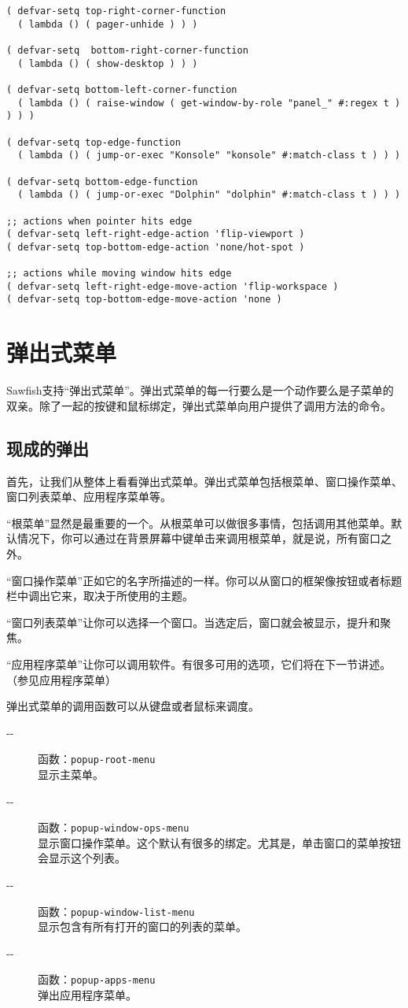 \documentclass{book}
\begin{document}
\begin{CJK*}{UTF8}{gbsn}
\begin{verbatim}
( defvar-setq top-right-corner-function
  ( lambda () ( pager-unhide ) ) )

( defvar-setq  bottom-right-corner-function
  ( lambda () ( show-desktop ) ) )

( defvar-setq bottom-left-corner-function
  ( lambda () ( raise-window ( get-window-by-role "panel_" #:regex t ) ) ) )

( defvar-setq top-edge-function
  ( lambda () ( jump-or-exec "Konsole" "konsole" #:match-class t ) ) )

( defvar-setq bottom-edge-function
  ( lambda () ( jump-or-exec "Dolphin" "dolphin" #:match-class t ) ) )

;; actions when pointer hits edge
( defvar-setq left-right-edge-action 'flip-viewport )
( defvar-setq top-bottom-edge-action 'none/hot-spot )

;; actions while moving window hits edge
( defvar-setq left-right-edge-move-action 'flip-workspace )
( defvar-setq top-bottom-edge-move-action 'none )
\end{verbatim}
\chapter{弹出式菜单}
Sawfish支持``弹出式菜单''。弹出式菜单的每一行要么是一个动作要么是子菜单的双亲。除了一起的按键和鼠标绑定，弹出式菜单向用户提供了调用方法的命令。
\section{现成的弹出}
首先，让我们从整体上看看弹出式菜单。弹出式菜单包括根菜单、窗口操作菜单、窗口列表菜单、应用程序菜单等。

``根菜单''显然是最重要的一个。从根菜单可以做很多事情，包括调用其他菜单。默认情况下，你可以通过在背景屏幕中键单击来调用根菜单，就是说，所有窗口之外。

``窗口操作菜单''正如它的名字所描述的一样。你可以从窗口的框架像按钮或者标题栏中调出它来，取决于所使用的主题。

``窗口列表菜单''让你可以选择一个窗口。当选定后，窗口就会被显示，提升和聚焦。

``应用程序菜单''让你可以调用软件。有很多可用的选项，它们将在下一节讲述。（参见应用程序菜单）

弹出式菜单的调用函数可以从键盘或者鼠标来调度。
\begin{description}
\item[-{}-] 函数：\verb|popup-root-menu|\\
显示主菜单。
\item[-{}-] 函数：\verb|popup-window-ops-menu|\\
显示窗口操作菜单。这个默认有很多的绑定。尤其是，单击窗口的菜单按钮会显示这个列表。
\item[-{}-] 函数：\verb|popup-window-list-menu|\\
显示包含有所有打开的窗口的列表的菜单。
\item[-{}-] 函数：\verb|popup-apps-menu|\\
弹出应用程序菜单。
\end{description}


\end{CJK*}
\end{document}
